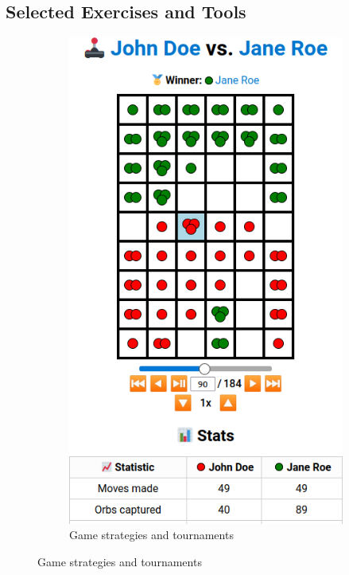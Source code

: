 \subsection{Selected Exercises and Tools}\label{sec:selected_exercises}

\begin{figure}[t!]
\centering
\begin{subfigure}[t]{0.3\textwidth}
  \centering
  \includegraphics[width=\linewidth]{img/chainreaction}
  \caption{Game strategies and tournaments}

\end{subfigure}
\end{figure}
